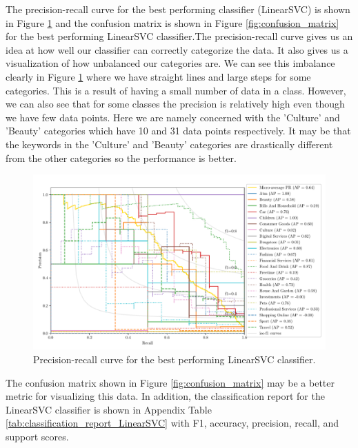 The precision-recall curve for the best performing classifier (LinearSVC) is shown in Figure \ref{fig:pr_curve} and the confusion matrix is shown in Figure \ref{fig:confusion_matrix} for the best performing LinearSVC classifier.The precision-recall curve gives us an idea at how well our classifier can correctly categorize the data. It also gives us a visualization of how unbalanced our categories are. We can see this imbalance clearly in Figure \ref{fig:pr_curve} where we have straight lines and large steps for some categories. This is a result of having a small number of data in a class. However, we can also see that for some classes the precision is relatively high even though we have few data points. Here we are namely concerned with the 'Culture' and 'Beauty' categories which have 10 and 31 data points respectively. It may be that the keywords in the 'Culture' and 'Beauty' categories are drastically different from the other categories so the performance is better. 

\begin{figure}[ht]
  \centering
  \includegraphics[width=\scale\textwidth]{../img/plot_pr_curve.pdf}
  \caption{Precision-recall curve for the best performing LinearSVC classifier.}
  \label{fig:pr_curve}
\end{figure}

The confusion matrix shown in Figure \ref{fig:confusion_matrix} may be a better metric for visualizing this data. In addition, the classification report for the LinearSVC classifier is shown in Appendix Table \ref{tab:classification_report_LinearSVC} with F1, accuracy, precision, recall, and support scores.

